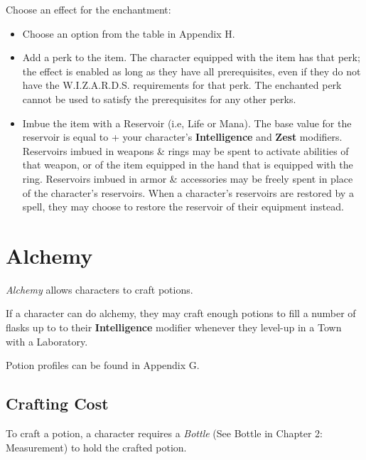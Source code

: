 \vspace{0.4em}

Choose an effect for the enchantment:
\begin{itemize}
  \item Choose an option from the table in Appendix H.
  \item Add a perk to the item. The character equipped with the item has that perk; 
    the effect is enabled as long as they have all prerequisites, 
    even if they do not have the W.I.Z.A.R.D.S. requirements for that perk.
    The enchanted perk cannot be used to satisfy the prerequisites for any other perks.
  \item Imbue the item with a Reservoir (i.e, Life or Mana). 
    The base value for the reservoir is equal to  + 
    your character's \textbf{Intelligence} and \textbf{Zest} modifiers. 
    Reservoirs imbued in weapons \& rings may be spent to activate abilities of that weapon, 
    or of the item equipped in the hand that is equipped with the ring. 
    Reservoirs imbued in armor \& accessories may be freely spent in place of the character's reservoirs. 
    When a character's reservoirs are restored by a spell, 
    they may choose to restore the reservoir of their equipment instead.
\end{itemize}



\section{Alchemy}
\textit{Alchemy} allows characters to craft potions.

\vspace{0.4em}

If a character can do alchemy, 
they may craft enough potions to fill a number of flasks up to to their \textbf{Intelligence} modifier 
whenever they level-up in a Town with a Laboratory.

\vspace{0.4em}

Potion profiles can be found in Appendix G.


\subsection{Crafting Cost}
To craft a potion, a character requires a \textit{Bottle} (See Bottle in Chapter 2: Measurement) 
to hold the crafted potion.

\vspace{0.4em}

